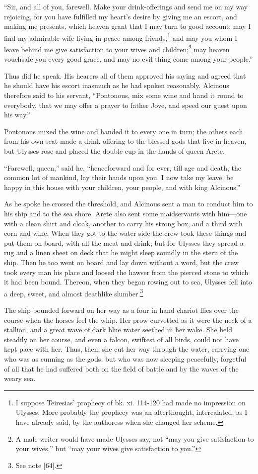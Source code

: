 “Sir, and all of you, farewell. Make your drink-offerings and send me on my way
rejoicing, for you have fulfilled my heart’s desire by giving me an escort, and
making me presents, which heaven grant that I may turn to good account; may I
find my admirable wife living in peace among friends,\footnote{I suppose Teiresias’ prophecy of bk. xi. 114-120 had made no impression on
Ulysses. More probably the prophecy was an afterthought, intercalated, as I
have already said, by the authoress when she changed her scheme.} and may you whom I leave behind me
give satisfaction to your wives and children;\footnote{A male writer would have made Ulysses say, not “may you give satisfaction to
your wives,” but “may your wives give satisfaction to you.”} may heaven vouchsafe you every good
grace, and may no evil thing come among your people.”

Thus did he speak. His hearers all of them approved his saying and agreed that
he should have his escort inasmuch as he had spoken reasonably. Alcinous
therefore said to his servant, “Pontonous, mix some wine and hand it round to
everybody, that we may offer a prayer to father Jove, and speed our guest upon
his way.”

Pontonous mixed the wine and handed it to every one in turn; the others each
from his own seat made a drink-offering to the blessed gods that live in
heaven, but Ulysses rose and placed the double cup in the hands of queen Arete.

“Farewell, queen,” said he, “henceforward and for ever, till age and death, the
common lot of mankind, lay their hands upon you. I now take my leave; be happy
in this house with your children, your people, and with king Alcinous.”

As he spoke he crossed the threshold, and Alcinous sent a man to conduct him to
his ship and to the sea shore. Arete also sent some maidservants with him—one
with a clean shirt and cloak, another to carry his strong box, and a third with
corn and wine. When they got to the water side the crew took these things and
put them on board, with all the meat and drink; but for Ulysses they spread a
rug and a linen sheet on deck that he might sleep soundly in the stern of the
ship. Then he too went on board and lay down without a word, but the crew took
every man his place and loosed the hawser from the pierced stone to which it
had been bound. Thereon, when they began rowing out to sea, Ulysses fell into a
deep, sweet, and almost deathlike slumber.\footnote{See note [64].}

The ship bounded forward on her way as a four in hand chariot flies over the
course when the horses feel the whip. Her prow curvetted as it were the neck of
a stallion, and a great wave of dark blue water seethed in her wake. She held
steadily on her course, and even a falcon, swiftest of all birds, could not
have kept pace with her. Thus, then, she cut her way through the water,
carrying one who was as cunning as the gods, but who was now sleeping
peacefully, forgetful of all that he had suffered both on the field of battle
and by the waves of the weary sea.

